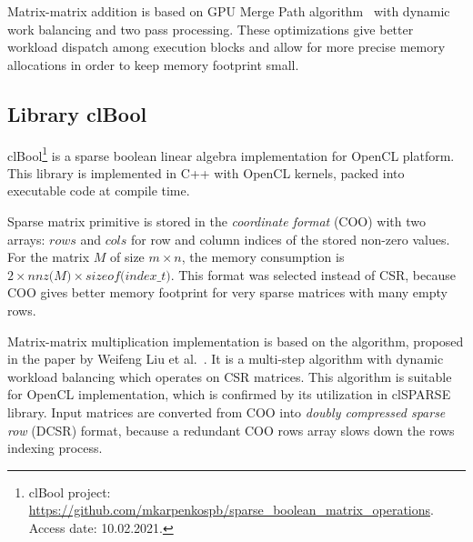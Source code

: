 Matrix-matrix addition is based on GPU Merge Path algorithm~\cite{inproceedings:gpu_merge_path} with dynamic work balancing and two pass processing.
These optimizations give better workload dispatch among execution blocks and allow for more precise memory allocations in order to keep memory footprint small.


\subsection{Library clBool}

clBool\footnote{clBool project: \url{https://github.com/mkarpenkospb/sparse_boolean_matrix_operations}. Access date: 10.02.2021.} 
is a sparse boolean linear algebra implementation for OpenCL platform.
This library is implemented in C++ with OpenCL kernels, packed into executable code at compile time. 

Sparse matrix primitive is stored in the \textit{coordinate format} (COO) with two arrays: $rows$ and $cols$ for row and column indices of the stored non-zero values.
For the matrix $M$ of size $m \times n$, the memory consumption is $2 \times \textit{nnz(M)} \times \textit{sizeof(index\_t)}$.
This format was selected instead of CSR, because COO gives better memory footprint for very sparse matrices with many empty rows.

Matrix-matrix multiplication implementation is based on the algorithm, proposed in the paper by Weifeng Liu et al.~\cite{DBLP:journals/corr/0002V15a:spframework}.
It is a multi-step algorithm with dynamic workload balancing which operates on CSR matrices.
This algorithm is suitable for OpenCL implementation, which is confirmed by its utilization in clSPARSE library.
Input matrices are converted from COO into \textit{doubly compressed sparse row} (DCSR) format,
because a redundant COO rows array slows down the rows indexing process. 

